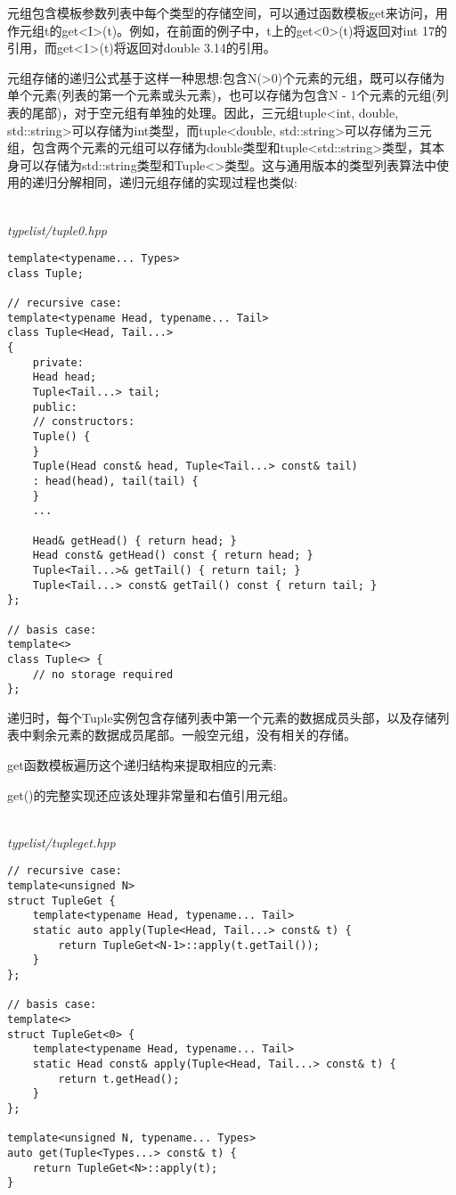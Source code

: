 



元组包含模板参数列表中每个类型的存储空间，可以通过函数模板get来访问，用作元组t的get<I>(t)。例如，在前面的例子中，t上的get<0>(t)将返回对int 17的引用，而get<1>(t)将返回对double 3.14的引用。

元组存储的递归公式基于这样一种思想:包含N(>0)个元素的元组，既可以存储为单个元素(列表的第一个元素或头元素)，也可以存储为包含N - 1个元素的元组(列表的尾部)，对于空元组有单独的处理。因此，三元组tuple<int, double, std::string>可以存储为int类型，而tuple<double, std::string>可以存储为三元组，包含两个元素的元组可以存储为double类型和tuple<std::string>类型，其本身可以存储为std::string类型和Tuple<>类型。这与通用版本的类型列表算法中使用的递归分解相同，递归元组存储的实现过程也类似:

\hspace*{\fill} \\ %
\noindent
\textit{typelist/tuple0.hpp}
\begin{lstlisting}[style=styleCXX]
template<typename... Types>
class Tuple;

// recursive case:
template<typename Head, typename... Tail>
class Tuple<Head, Tail...>
{
	private:
	Head head;
	Tuple<Tail...> tail;
	public:
	// constructors:
	Tuple() {
	}
	Tuple(Head const& head, Tuple<Tail...> const& tail)
	: head(head), tail(tail) {
	}
	...
	
	Head& getHead() { return head; }
	Head const& getHead() const { return head; }
	Tuple<Tail...>& getTail() { return tail; }
	Tuple<Tail...> const& getTail() const { return tail; }
};

// basis case:
template<>
class Tuple<> {
	// no storage required
};
\end{lstlisting}

递归时，每个Tuple实例包含存储列表中第一个元素的数据成员头部，以及存储列表中剩余元素的数据成员尾部。一般空元组，没有相关的存储。

get函数模板遍历这个递归结构来提取相应的元素:

\begin{tcolorbox}[colback=webgreen!5!white,colframe=webgreen!75!black]
\hspace*{0.75cm}get()的完整实现还应该处理非常量和右值引用元组。
\end{tcolorbox}

\hspace*{\fill} \\ %
\noindent
\textit{typelist/tupleget.hpp}
\begin{lstlisting}[style=styleCXX]
// recursive case:
template<unsigned N>
struct TupleGet {
	template<typename Head, typename... Tail>
	static auto apply(Tuple<Head, Tail...> const& t) {
		return TupleGet<N-1>::apply(t.getTail());
	}
};

// basis case:
template<>
struct TupleGet<0> {
	template<typename Head, typename... Tail>
	static Head const& apply(Tuple<Head, Tail...> const& t) {
		return t.getHead();
	}
};

template<unsigned N, typename... Types>
auto get(Tuple<Types...> const& t) {
	return TupleGet<N>::apply(t);
}
\end{lstlisting}

